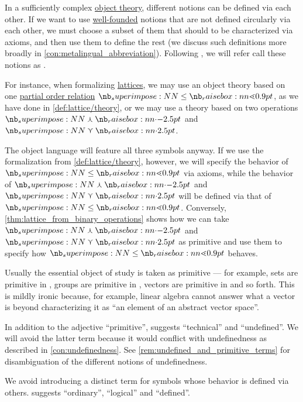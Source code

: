 \begin{concept}\label{con:primitive_notion}
  In a sufficiently complex \hyperref[con:metalogic]{object theory}, different notions can be defined via each other. If we want to use \hyperref[def:well_founded_relation]{well-founded} notions that are not defined circularly via each other, we must choose a subset of them that should to be characterized via axioms, and then use them to define the rest (we discuss such definitions more broadly in \cref{con:metalingual_abbreviation}). Following , we will refer call these notions as .

  For instance, when formalizing \hyperref[def:lattice]{lattices}, we may use an object theory based on one \hyperref[def:partially_ordered_set]{partial order relation} \( {\synleq} \), as we have done in \cref{def:lattice/theory}, or we may use a theory based on two operations \( {\synvarwedge} \) and \( {\synvarvee} \).

  The object language will feature all three symbols anyway. If we use the formalization from \cref{def:lattice/theory}, however, we will specify the behavior of \( {\synleq} \) via axioms, while the behavior of \( {\synvarwedge} \) and \( {\synvarvee} \) will be defined via that of \( {\synleq} \). Conversely, \cref{thm:lattice_from_binary_operations} shows how we can take \( {\synvarwedge} \) and \( {\synvarvee} \) as primitive and use them to specify how \( {\synleq} \) behaves.

  Usually the essential object of study is taken as primitive --- for example, sets are primitive in , groups are primitive in , vectors are primitive in  and so forth. This is mildly ironic because, for example, linear algebra cannot answer what a vector is beyond characterizing it as \enquote{an element of an abstract vector space}.
\end{concept}
\begin{comments}
  \item In addition to the adjective \enquote{primitive},  suggests \enquote{technical} and \enquote{undefined}. We will avoid the latter term because it would conflict with undefinedness as described in \cref{con:undefinedness}. See \cref{rem:undefined_and_primitive_terms} for disambiguation of the different notions of undefinedness.

  \item We avoid introducing a distinct term for symbols whose behavior is defined via others.  suggests \enquote{ordinary}, \enquote{logical} and \enquote{defined}.
\end{comments}


